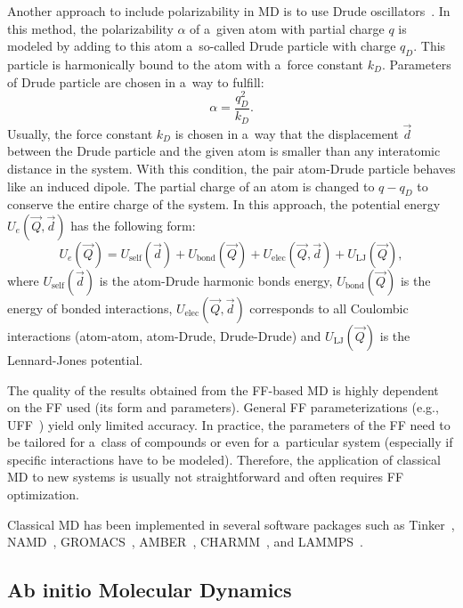 Another approach to include polarizability in MD is to use Drude oscillators~\cite{ff-drude}. In this method, the polarizability $\alpha$ of a~given atom with partial charge $q$ is modeled by adding to this atom a~so-called Drude particle with charge $q_D$. This particle is harmonically bound to the atom with a~force constant $k_D$. Parameters of Drude particle are chosen in a~way to fulfill:
\begin{equation}
    \alpha = \frac{q_{D}^2}{k_D}.
\end{equation}
Usually, the force constant $k_D$ is chosen in a~way that the displacement $\Vec{d}$ between the Drude particle and the given atom is smaller than any interatomic distance in the system. With this condition, the pair atom-Drude particle behaves like an induced dipole. The partial charge of an atom is changed to $q - q_D$ to conserve the entire charge of the system. In this approach, the potential energy $U_e(\Vec{Q}, \Vec{d})$ has the following form:
\begin{equation}
    U_e(\Vec{Q}) = U_{\text{self}}(\vec{d}) + U_{\text{bond}}(\vec{Q}) + U_{\text{elec}}(\vec{Q}, \vec{d}) + U_{\text{LJ}}(\vec{Q}),
\end{equation}
where $U_{\text{self}}(\vec{d})$ is the atom-Drude harmonic bonds energy, $U_{\text{bond}}(\vec{Q})$ is the energy of bonded interactions, $U_{\text{elec}}(\vec{Q}, \vec{d})$ corresponds to all Coulombic interactions (atom-atom, atom-Drude, Drude-Drude) and $U_{\text{LJ}}(\vec{Q})$ is the Lennard-Jones potential.

The quality of the results obtained from the FF-based MD is highly dependent on the FF used (its form and parameters). General FF parameterizations (e.g., UFF~\cite{ff-uff}) yield only limited accuracy. In practice, the parameters of the FF need to be tailored for a~class of compounds or even for a~particular system (especially if specific interactions have to be modeled). Therefore, the application of classical MD to new systems is usually not straightforward and often requires FF optimization.

Classical MD has been implemented in several software packages such as Tinker~\cite{tinker}, NAMD~\cite{namd}, GROMACS~\cite{gromacs}, AMBER~\cite{amber}, CHARMM~\cite{charmm}, and LAMMPS~\cite{lammps}.

\subsection{Ab initio Molecular Dynamics}


